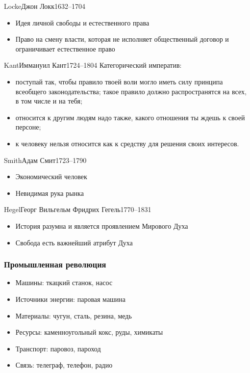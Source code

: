 \documentclass[aspectratio=169]{beamer}
\begin{document}
\begin{Person}{Locke}{Джон Локк}{1632--1704}
\begin{itemize}
\item Идея личной свободы и естественного права
\item Право на смену власти, которая не исполняет общественный договор и ограничивает естественное право 
\end{itemize}
\end{Person}

\begin{Person}{Kant}{Иммануил Кант}{1724--1804}
Категорический императив:
\begin{itemize}
\item поступай так, чтобы правило твоей воли могло иметь силу принципа всеобщего законодательства; такое правило должно распространятся на всех, в том числе и на тебя;
\item относится к другим людям надо также, какого отношения ты ждешь к своей персоне;
\item к человеку нельзя относится как к средству для решения своих интересов.
\end{itemize}
\end{Person}

\begin{Person}{Smith}{Адам Смит}{1723--1790}

\begin{itemize}
\item Экономический человек
\item Невидимая рука рынка
\end{itemize}

\end{Person}

\begin{Person}{Hegel}{Георг Вильгельм Фридрих Гегель}{1770--1831}

\begin{itemize}
\item История разумна и является проявлением Мирового Духа
\item Свобода есть важнейший атрибут Духа
\end{itemize}
\end{Person}

\begin{bframe}\frametitle{Промышленная революция}
\begin{itemize}
\item<1-> Машины: ткацкий станок, насос
\item<3-> Источники энергии: паровая машина
\item<5-> Материалы: чугун, сталь, резина, медь
\item<6-> Ресурсы: каменноугольный кокс, руды, химикаты
\item<7-> Транспорт: паровоз, пароход
\item<9-> Связь: телеграф, телефон, радио
\end{itemize}
\end{bframe}
\end{document}
